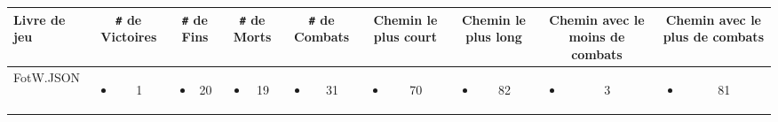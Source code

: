 \documentclass[a4paper,12pt]{article}
\begin{document}
\begin{table}[h]
\hspace{-1cm}
\begin{minipage}{\textwidth}
\centering
\small
\renewcommand{\arraystretch}{1}
\begin{tabular}{|L|C|C|C|C|C|C|C|C|}
\hline
\textbf{Livre de jeu} & \textbf{\texttt{\#} de Victoires} & \textbf{\texttt{\#} de Fins} & \textbf{\texttt{\#} de Morts} & \textbf{\texttt{\#} de Combats} & \textbf{Chemin le plus court}  & \textbf{Chemin le plus long} & \textbf{Chemin avec le moins de combats} & \textbf{Chemin avec le plus de combats} \\ \hline
FotW.JSON & \vspace{0.4cm}\begin{itemize}
               \item[] 1
           \end{itemize} & \vspace{0.4cm}\begin{itemize}
                             \item[] 20
                         \end{itemize} & \vspace{0.4cm}\begin{itemize}
                                       \item[] 19
                                   \end{itemize} & \vspace{0.4cm}\begin{itemize}
                                                 \item[] 31
                                             \end{itemize} &
                                             \vspace{0.4cm}\begin{itemize}
                                                 \item[] 70
                                             \end{itemize} &
                                             \vspace{0.4cm}\begin{itemize}
                                                 \item[] 82
                                              \end{itemize} &
                                             \vspace{0.4cm}\begin{itemize}
                                                 \item[] 3
                                              \end{itemize} &
                                             \vspace{0.4cm}\begin{itemize}
                                                 \item[] 81
                                             \end{itemize}\\ \hline
                                             

\end{tabular}
\end{minipage}
\end{table}
\end{document}
